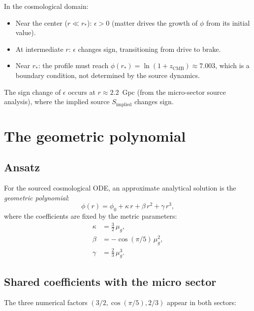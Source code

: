 \documentclass[11pt,letterpaper]{article}
\numberwithin{equation}{section}
\begin{document}
In the cosmological domain:
\begin{itemize}
  \item Near the center ($r \ll r_*$): $\epsilon > 0$ (matter drives the
    growth of $\phi$ from its initial value).
  \item At intermediate $r$: $\epsilon$ changes sign, transitioning from
    drive to brake.
  \item Near $r_*$: the profile must reach $\phi(r_*) = \ln(1+z_\mathrm{CMB}) \approx 7.003$,
    which is a boundary condition, not determined by the source dynamics.
\end{itemize}

The sign change of $\epsilon$ occurs at $r \approx 2.2$~Gpc (from the
micro-sector source analysis), where the implied source $S_\mathrm{implied}$
changes sign.

\section{The geometric polynomial}
\label{sec:polynomial}

\subsection{Ansatz}

For the sourced cosmological ODE, an approximate analytical solution is the
\emph{geometric polynomial}:
\begin{equation}
\label{eq:geo_poly}
  \phi(r) = \phi_0 + \kappa\,r + \beta\,r^2 + \gamma\,r^3,
\end{equation}
where the coefficients are fixed by the metric parameters:
\begin{align}
  \kappa &= \frac{3}{2}\,\mu_g, \label{eq:kappa_coeff}\\
  \beta  &= -\cos(\pi/5)\,\mu_g^2, \label{eq:beta_coeff}\\
  \gamma &= \frac{2}{3}\,\mu_g^3. \label{eq:gamma_coeff}
\end{align}

\subsection{Shared coefficients with the micro sector}

The three numerical factors $(3/2, \cos(\pi/5), 2/3)$ appear in both
sectors:
\end{document}
